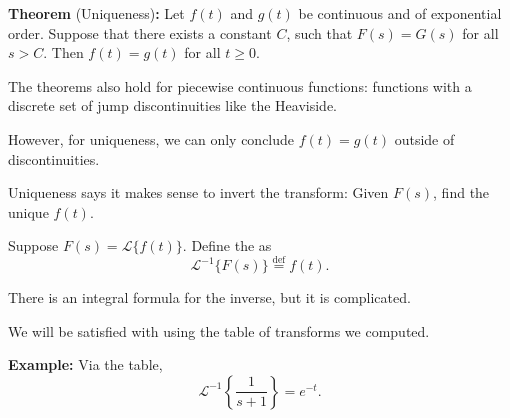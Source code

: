 \documentclass[10pt,aspectratio=169]{beamer}
\begin{document}
\begin{frame}

\textbf{Theorem} (Uniqueness)\textbf{:}
Let $f(t)$ and $g(t)$ be continuous and of exponential order.
Suppose that there exists a constant $C$,
such that $F(s) = G(s)$ for all $s > C$.
Then $f(t) = g(t)$ for all $t \geq 0$.

\medskip
\pause

The theorems also hold for piecewise continuous functions:
functions with a discrete set of jump discontinuities like the
Heaviside.

\medskip

However, for uniqueness, we can only conclude
$f(t) = g(t)$ outside of discontinuities.

\medskip
\pause

Uniqueness says it makes sense to invert the transform:
Given $F(s)$, find the unique $f(t)$.

\medskip
\pause

Suppose $F(s) = \mathcal{L} \bigl\{ f(t) \bigr\}$.
Define the
\emph{} as
\begin{equation*}
{\mathcal{L}}^{-1} \bigl\{ F(s) \bigr\} \overset{\text{def}}{=} f(t) .
\end{equation*}

\pause

There is an integral formula for the inverse, but it is complicated.

We will be satisfied with using the table of transforms we computed.

\medskip
\pause

\textbf{Example:}
Via the table,
\begin{equation*}
{\mathcal{L}}^{-1} \left\{ \frac{1}{s+1} \right\} = 
e^{-t} .
\end{equation*}

\end{frame}
\end{document}
